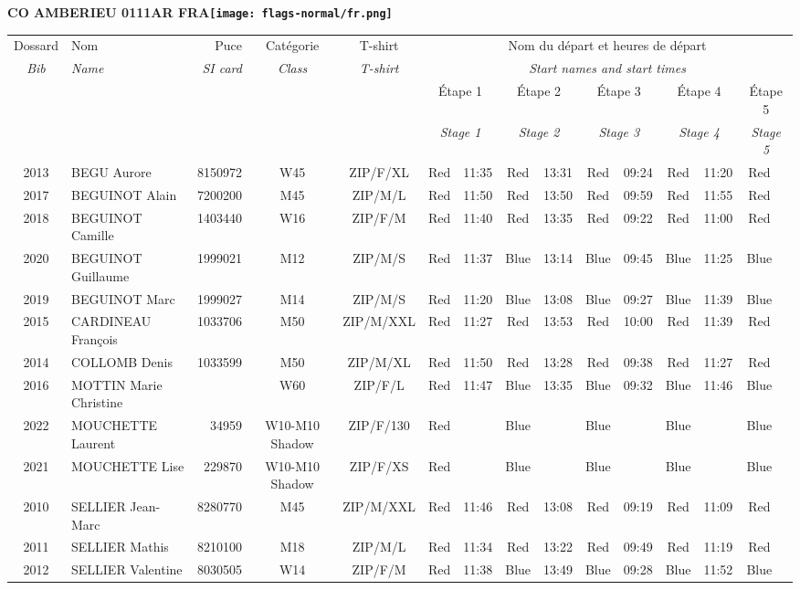 \documentclass{report}
\begin{document}
\newpage
  \Huge \centering \bfseries CO AMBERIEU 0111AR FRA\normalfont \footnotesize \sffamily \hfill \texttt{[image: flags-normal/fr.png]} \newline 
  \begin{longtable}{|c|l|r|c|c|*{5}{cc|}}
    Dossard & Nom  & Puce    & Catégorie & T-shirt & \multicolumn{10}{c|}{Nom du départ et heures de départ} \\
    \itshape Bib     & \itshape Name & \itshape SI card & \itshape Class  & \itshape  T-shirt  & \multicolumn{10}{c|}{\itshape Start names and start times} \\
    \hline
    & & & & & \multicolumn{2}{c|}{Étape 1} & \multicolumn{2}{c|}{Étape 2} & \multicolumn{2}{c|}{Étape 3} & \multicolumn{2}{c|}{Étape 4} & \multicolumn{2}{c|}{Étape 5} \\
    & & & & & \multicolumn{2}{c|}{\itshape Stage 1} & \multicolumn{2}{c|}{\itshape Stage 2} & \multicolumn{2}{c|}{\itshape Stage 3} & \multicolumn{2}{c|}{\itshape Stage 4} & \multicolumn{2}{c|}{\itshape Stage 5} \\
    \hline
    2013 & BEGU Aurore & 8150972 & W45 & ZIP/F/XL & Red & 11:35 & Red & 13:31 & Red & 09:24 & Red & 11:20 & Red &  \\
    2017 & BEGUINOT Alain & 7200200 & M45 & ZIP/M/L & Red & 11:50 & Red & 13:50 & Red & 09:59 & Red & 11:55 & Red &  \\
    2018 & BEGUINOT Camille & 1403440 & W16 & ZIP/F/M & Red & 11:40 & Red & 13:35 & Red & 09:22 & Red & 11:00 & Red &  \\
    2020 & BEGUINOT Guillaume & 1999021 & M12 & ZIP/M/S & Red & 11:37 & Blue & 13:14 & Blue & 09:45 & Blue & 11:25 & Blue &  \\
    2019 & BEGUINOT Marc & 1999027 & M14 & ZIP/M/S & Red & 11:20 & Blue & 13:08 & Blue & 09:27 & Blue & 11:39 & Blue &  \\
    2015 & CARDINEAU François & 1033706 & M50 & ZIP/M/XXL & Red & 11:27 & Red & 13:53 & Red & 10:00 & Red & 11:39 & Red &  \\
    2014 & COLLOMB Denis & 1033599 & M50 & ZIP/M/XL & Red & 11:50 & Red & 13:28 & Red & 09:38 & Red & 11:27 & Red &  \\
    2016 & MOTTIN Marie Christine &  & W60 & ZIP/F/L & Red & 11:47 & Blue & 13:35 & Blue & 09:32 & Blue & 11:46 & Blue &  \\
    2022 & MOUCHETTE Laurent & 34959 & W10-M10 Shadow & ZIP/F/130 & Red &   & Blue &   & Blue &   & Blue &   & Blue &  \\
    2021 & MOUCHETTE Lise & 229870 & W10-M10 Shadow & ZIP/F/XS & Red &   & Blue &   & Blue &   & Blue &   & Blue &  \\
    2010 & SELLIER Jean-Marc & 8280770 & M45 & ZIP/M/XXL & Red & 11:46 & Red & 13:08 & Red & 09:19 & Red & 11:09 & Red &  \\
    2011 & SELLIER Mathis & 8210100 & M18 & ZIP/M/L & Red & 11:34 & Red & 13:22 & Red & 09:49 & Red & 11:19 & Red &  \\
    2012 & SELLIER Valentine & 8030505 & W14 & ZIP/F/M & Red & 11:38 & Blue & 13:49 & Blue & 09:28 & Blue & 11:52 & Blue &  \\
  \end{longtable}
\end{document}
